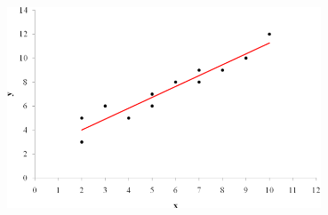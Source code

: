 \begin{exemple}
\begin{center}
\includegraphics[width = 0.7\textwidth]{statistiques/image/regression10.png}
\end{center}


\end{exemple}


